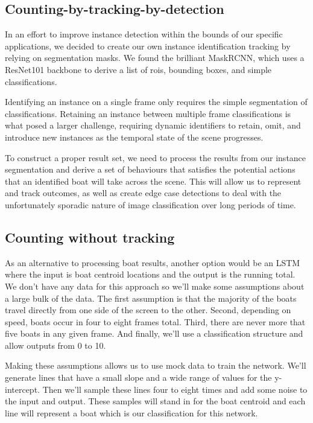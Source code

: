 \documentclass[10pt,twocolumn,letterpaper]{article}
\begin{document}
\subsection{Counting-by-tracking-by-detection}

In an effort to improve instance detection within the bounds of our specific applications, we decided to create our own instance identification tracking by relying on segmentation masks.  We found the brilliant MaskRCNN, which uses a ResNet101 backbone to derive a list of rois, bounding boxes, and simple classifications.

Identifying an instance on a single frame only requires the simple  segmentation of classifications.  Retaining an instance between multiple frame classifications is what posed a larger challenge, requiring dynamic identifiers to retain, omit, and introduce new instances as the temporal state of the scene progresses.  

To construct a proper result set, we need to process the results from our instance segmentation and derive a set of behaviours that satisfies the potential actions that an identified boat will take across the scene.  This will allow us to represent and track outcomes, as well as create edge case detections to deal with the unfortunately sporadic nature of image classification over long periods of time.


\subsection{Counting without tracking}

As an alternative to processing boat results, another option would be an LSTM where the input is boat centroid locations and the output is the running total. We don't have any data for this approach so we'll make some assumptions about a large bulk of the data. The first assumption is that the majority of the boats travel directly from one side of the screen to the other. Second, depending on speed, boats occur in four to eight frames total. Third, there are never more that five boats in any given frame. And finally, we'll use a classification structure and allow outputs from 0 to 10. 

Making these assumptions allows us to use mock data to train the network. We'll generate lines that have a small slope and a wide range of values for the y-intercept. Then we'll sample these lines four to eight times and add some noise to the input and output. These samples will stand in for the boat centroid and each line will represent a boat which is our classification for this network.
\end{document}
